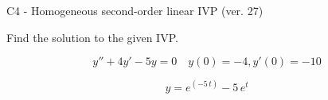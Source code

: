 \begin{exercise}
  \begin{exerciseTitle}C4 - Homogeneous second-order linear IVP (ver. 27)\end{exerciseTitle}
  \begin{exerciseStatement}
    
Find the solution to the given IVP.

    
\[y''+4y'-5y = 0 \hspace{1em} y(0) = -4 , y'(0) = -10\]

  \end{exerciseStatement}
  \begin{exerciseAnswer}
    
\[y= e^{\left(-5 \, t\right)} - 5 \, e^{t}\]

  \end{exerciseAnswer}
\end{exercise}